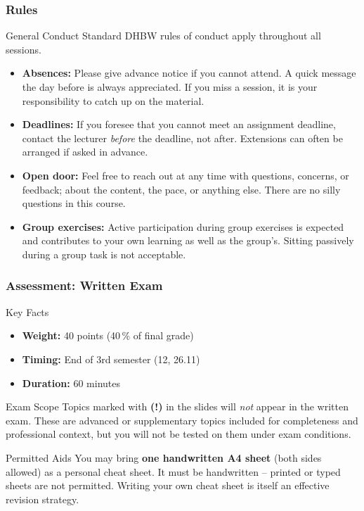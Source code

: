 \begin{frame}
  \frametitle{Rules}

  \begin{block}{General Conduct}
    Standard DHBW rules of conduct apply throughout all sessions.
  \end{block}

  \begin{itemize}
    \item \textbf{Absences:} Please give advance notice if you cannot attend. A quick message the day before is always appreciated. If you miss a session, it is your responsibility to catch up on the material.
    \item \textbf{Deadlines:} If you foresee that you cannot meet an assignment deadline, contact the lecturer \emph{before} the deadline, not after. Extensions can often be arranged if asked in advance.
    \item \textbf{Open door:} Feel free to reach out at any time with questions, concerns, or feedback; about the content, the pace, or anything else. There are no silly questions in this course.
    \item \textbf{Group exercises:} Active participation during group exercises is expected and contributes to your own learning as well as the group's. Sitting passively during a group task is not acceptable.
  \end{itemize}

\end{frame}

\begin{frame}
  \frametitle{Assessment: Written Exam}

  \begin{block}{Key Facts}
    \begin{itemize}
      \item \textbf{Weight:} 40 points \quad(40\,\% of final grade)
      \item \textbf{Timing:} End of 3rd semester (12, 26.11)
      \item \textbf{Duration:} 60 minutes
    \end{itemize}
  \end{block}

  \begin{alertblock}{Exam Scope}
    Topics marked with \textbf{(!)} in the slides will \emph{not} appear in the written exam. These are advanced or supplementary topics included for completeness and professional context, but you will not be tested on them under exam conditions.
  \end{alertblock}

  \begin{examples}{Permitted Aids}
    You may bring \textbf{one handwritten A4 sheet} (both sides allowed) as a personal cheat sheet. It must be handwritten -- printed or typed sheets are not permitted. Writing your own cheat sheet is itself an effective revision strategy.
  \end{examples}

\end{frame}

